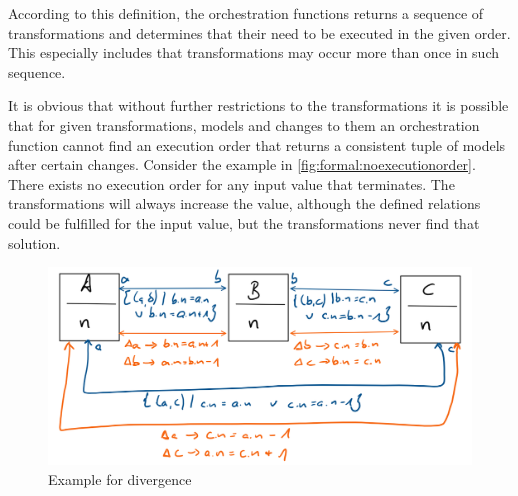 
According to this definition, the orchestration functions returns a sequence of transformations and determines that their \modellevelconsistencypreservationrules need to be executed in the given order. 
This especially includes that transformations may occur more than once in such sequence.

It is obvious that without further restrictions to the transformations it is possible that for given transformations, models and changes to them an orchestration function cannot find an execution order that returns a consistent tuple of models after certain changes. 
Consider the example in \autoref{fig:formal:noexecutionorder}. There exists no execution order for any input value that terminates. The transformations will always increase the value, although the defined relations could be fulfilled for the input value, but the transformations never find that solution.

\begin{figure}
    \centering
    \includegraphics[width=\textwidth]{figures/correctness/formal/divergence_example.png}
    \caption{Example for divergence}
    \label{fig:formal:noexecutionorder}
\end{figure}

